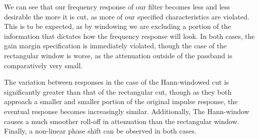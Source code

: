 \documentclass[journal]{IEEEtran}
\begin{document}
We can see that our frequency response of our filter becomes less and less desirable the more it is cut, as more of our specified characteristics are violated. This is to be expected, as by windowing we are excluding a portion of the information that dictates how the frequency response will look. In both cases, the gain margin specification is immediately violated, though the case of the rectangular window is worse, as the attenuation outside of the passband is comparatively very small. 

The variation between responses in the case of the Hann-windowed cut is significantly greater than that of the rectangular cut, though as they both approach a smaller and smaller portion of the original impulse response, the eventual response becomes increasingly similar. Additionally, The Hann-window causes a much smoother roll-off in attenuation than the rectangular window. Finally, a non-linear phase shift can be observed in both cases.
\end{document}
